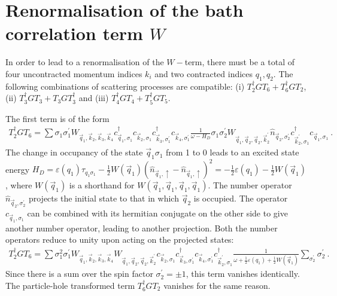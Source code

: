 \documentclass{revtex4-2}
\begin{document}
\section{Renormalisation of the bath correlation term \(W\)}
In order to lead to a renormalisation of the \(W-\)term, there must be a total of four uncontracted momentum indices \(k_i\) and two contracted indices \(q_1, q_2\). The following combinations of scattering processes are compatible: (i) \(T_2^\dagger G T_6 + T_6^\dagger G T_2\), (ii) \(T_3^\dagger G T_3 + T_3 G T_3^\dagger\) and (iii) \(T_4^\dagger G T_4 + T_5^\dagger G T_5\).

The first term is of the form
\begin{equation}\begin{aligned}
	T_2^\dagger G T_6 = \sum \sigma_1\sigma_1^\prime W_{\vec q_1,\vec k_2,\vec k_3,\vec k_4} c^\dagger_{\vec q_1, \sigma_1}c_{\vec k_2,\sigma_1}c^\dagger_{\vec k_3,\sigma_1^\prime}c_{\vec k_4,\sigma_1^\prime} \frac{1}{\omega - H_D}\sigma_1\sigma_2^\prime W_{\vec q_1,\vec q_2,\vec q_2,\vec k_2^\prime} \hat n_{\vec q_2,\sigma_2^\prime}c^\dagger_{\vec k_2^\prime,\sigma_1}c_{\vec q_1,\sigma_1}~.
\end{aligned}\end{equation}
The change in occupancy of the state \(\vec q_1\sigma_1\) from 1 to 0 leads to an excited state energy \(H_D = \varepsilon(q_1)\tau_{q_1\sigma_1} - \frac{1}{2}W\left(\vec q_1\right)\left(\hat n_{\vec q_1, \uparrow} - \hat n_{\vec q_1, \uparrow}\right)^2 = -\frac{1}{2}\varepsilon(q_1) - \frac{1}{2}W\left(\vec q_1\right)\), where \(W\left(\vec q_1\right)\) is a shorthand for \(W\left(\vec q_1,\vec q_1,\vec q_1,\vec q_1\right)\). The number operator \(\hat n_{\vec q_2,\sigma_2^\prime}\) projects the initial state to that in which \(\vec q_2\) is occupied. The operator \(c_{\vec q_1,\sigma_1}\) can be combined with its hermitian conjugate on the other side to give another number operator, leading to another projection. Both the number operators reduce to unity upon acting on the projected states:
\begin{equation}\begin{aligned}
	T_2^\dagger G T_6 = \sum \sigma_1^2\sigma_1^\prime W_{\vec q_1,\vec k_2,\vec k_3,\vec k_4} W_{\vec q_1,\vec q_2,\vec q_2,\vec k_2^\prime} c_{\vec k_2,\sigma_1}c^\dagger_{\vec k_3,\sigma_1^\prime}c_{\vec k_4,\sigma_1^\prime} c^\dagger_{\vec k_2^\prime,\sigma_1}\frac{1}{\omega + \frac{1}{2}\varepsilon(q_1) + \frac{1}{2}W\left(\vec q_1\right)}\sum_{\sigma_2^\prime}\sigma_2^\prime  ~.
\end{aligned}\end{equation}
Since there is a sum over the spin factor \(\sigma_2^\prime = \pm 1\), this term vanishes identically. The particle-hole transformed term \(T_6^\dagger G T_2\) vanishes for the same reason.
\end{document}
